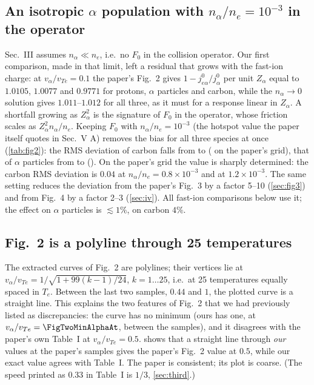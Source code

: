 \documentclass[11pt,a4paper]{article}
\begin{document}
\subsection{An isotropic $\alpha$ population with $n_\alpha/n_e=10^{-3}$ in the operator}\label{sec:nratio}
Sec.~III assumes $n_\alpha\ll n_e$, i.e.\ no $F_0$ in the collision operator. Our first comparison, made in that limit,
left a residual that grows with the fast-ion charge: at $v_\alpha/v_{Te}=0.1$ the paper's Fig.~2 gives
$1-j^0_{e\alpha}/j^0_\alpha$ per unit $Z_\alpha$ equal to $1.0105$, $1.0077$ and $0.9771$ for protons, $\alpha$ particles and
carbon, while the $n_\alpha\to0$ solution gives $1.011$--$1.012$ for all three, as it must for a response linear in
$Z_\alpha$. A shortfall growing as $Z_\alpha^2$ is the signature of $F_0$ in the operator, whose friction scales as
$Z_\alpha^2n_\alpha/n_e$. Keeping $F_0$ with $n_\alpha/n_e=10^{-3}$ (the hotspot value the paper itself quotes in Sec.~V A)
removes the bias for all three species at once (\cref{tab:fig2}): the RMS deviation of carbon falls from
\FigTwoRmsZeroCarbon{} to \FigTwoRmsCarbon{} (\FigTwoRmsGridCarbon{} on the paper's grid), that of $\alpha$ particles from
\FigTwoRmsZeroAlpha{} to \FigTwoRmsAlpha{} (\FigTwoRmsGridAlpha). On the paper's grid the value is sharply determined: the
carbon RMS deviation is $0.04$ at $n_\alpha/n_e=0.8\times10^{-3}$ and at $1.2\times10^{-3}$. The same setting reduces the
deviation from the paper's Fig.~3 by a factor 5--10 (\cref{sec:fig3}) and from Fig.~4 by a factor 2--3 (\cref{sec:iv}). All fast-ion
comparisons below use it; the effect on $\alpha$ particles is $\lesssim1\%$, on carbon $4\%$.

\subsection{Fig.~2 is a polyline through 25 temperatures}\label{sec:fig2-sampling}
The extracted curves of Fig.~2 are polylines; their vertices lie at $v_\alpha/v_{Te}=1/\sqrt{1+99(k-1)/24}$,
$k=1\dots25$, i.e.\ at 25 temperatures equally spaced in $T_e$. Between the last two samples, $0.44$ and $1$, the
plotted curve is a straight line. This explains the two features of Fig.~2 that we had previously listed as
discrepancies: the curve has no minimum (ours has one, \FigTwoMinAlpha{} at $v_\alpha/v_{Te}=\FigTwoMinAlphaAt$, between
the samples), and it disagrees with the paper's own Table~I at $v_\alpha/v_{Te}=0.5$.  shows that a
straight line through \emph{our} values at the paper's samples gives the paper's Fig.~2 value at $0.5$, while our exact
value agrees with Table~I. The paper is consistent; its plot is coarse. (The speed printed as 0.33 in Table~I is
$1/3$, \cref{sec:third}.)
\end{document}
